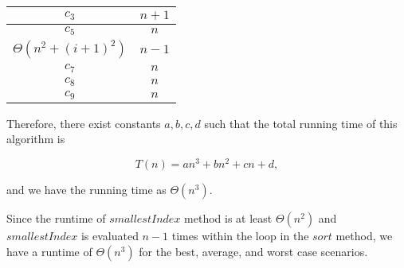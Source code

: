 \documentclass{article}
\begin{document}
\bigskip

\begin{tabular}{|c|c|}
\hline 
$c_3$ & $n+1$ \\ 
\hline 
$c_5$ & $n$ \\ 
\hline 
$\Theta\left(n^2 + (i+1)^2\right)$ & $n-1$ \\ 
\hline 
$c_7$ & $n$ \\ 
\hline 
$c_8$ & $n$ \\ 
\hline 
$c_9$ & $n$ \\ 
\hline  
\end{tabular} 

\bigskip
\bigskip

Therefore, there exist constants $a,b,c,d$ such that the total running time of this algorithm is

\[
	T(n) = a n^3 + b n^2 + c n + d,
\]

\noindent and we have the running time as $\Theta(n^3)$.

Since the runtime of $smallestIndex$ method is at least $\Theta(n^2)$ and $smallestIndex$ is evaluated $n-1$ times within the loop in the $sort$ method, we have a runtime of $\Theta(n^3)$ for the best, average, and worst case scenarios.
\end{document}

